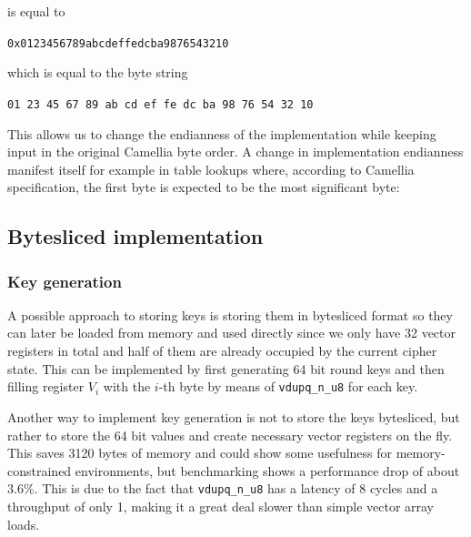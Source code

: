 is equal to

\begin{center}
    \texttt{0x0123456789abcdeffedcba9876543210}
\end{center}

which is equal to the byte string

\begin{center}
    \texttt{01 23 45 67 89 ab cd ef fe dc ba 98 76 54 32 10}
\end{center}

This allows us to change the endianness of the implementation while keeping
input in the original Camellia byte order. A change in implementation
endianness manifest itself for example in table lookups where, according to
Camellia specification, the first byte is expected to be the most significant
byte:



\subsection{Bytesliced implementation}

\subsubsection{Key generation}

A possible approach to storing keys is storing them in bytesliced format so
they can later be loaded from memory and used directly since we only have 32
vector registers in total and half of them are already occupied by the current
cipher state. This can be implemented by first generating 64 bit round keys and
then filling register $V_i$ with the $i$-th byte by means of
\texttt{vdupq\_n\_u8} for each key.



Another way to implement key generation is not to store the keys bytesliced,
but rather to store the 64 bit values and create necessary vector registers on
the fly. This saves 3120 bytes of memory and could show some usefulness for
memory-constrained environments, but benchmarking shows a performance drop of
about $3.6\%$. This is due to the fact that \texttt{vdupq\_n\_u8} has a latency
of 8 cycles and a throughput of only 1, making it a great deal slower than
simple vector array loads.

